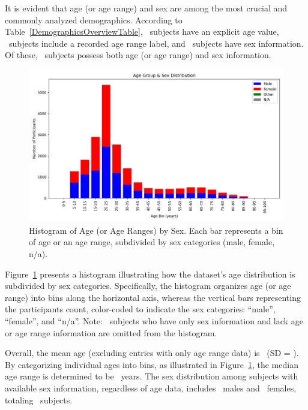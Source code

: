 It is evident that age (or age range) and sex are among the most crucial and commonly analyzed demographics. 
According to Table~\ref{DemographicsOverviewTable}, \TotalSubjectsWithAgeCount\ subjects have an explicit age value, 
\TotalSubjectsWithAgeGroupCount\ subjects include a recorded age range label, and \TotalSubjectsWithSexCount\ subjects have sex information. 
Of these, \TotalSubjectsWithAgeAgeGroupSexCount\ subjects possess both age (or age range) and sex information.


\begin{figure}[ht]
    \centering
    \includegraphics[width=\linewidth]{figures/age_group_sex_histogram} 
    \caption{Histogram of Age (or Age Ranges) by Sex. Each bar represents a bin of age or an age range, subdivided by sex categories (male, female, n/a).}
    \label{HistogramAgeSexFigure}
\end{figure}


\noindent
Figure~\ref{HistogramAgeSexFigure} presents a histogram illustrating how the dataset's age distribution is subdivided by sex categories. 
Specifically, the histogram organizes age (or age range) into bins along the horizontal axis, whereas the vertical bars 
representing the participants count, color-coded to indicate the sex categories: ``male'', ``female'', and ``n/a''. Note: \TotalSubjectsWithSexCountWithoutAgeInfo\ 
subjects who have only sex information and lack age or age range information are omitted from the histogram.


Overall, the mean age (excluding entries with only age range data) is \TotalSubjectsMeanAgeValue\ (SD = \TotalSubjectsStandardDevAgeValue{}). 
By categorizing individual ages into bins, as illustrated in Figure~\ref{HistogramAgeSexFigure}, the median age range is determined to be \TotalSubjectsMedianAgeGroupValue\ years.
The sex distribution among subjects with available sex information, 
regardless of age data, includes \TotalSubjectsWithMaleSexCount\ males 
and \TotalSubjectsWithFemaleCount\ females, 
totaling \TotalSubjectsWithMalePlusFemaleCount\ subjects. 

